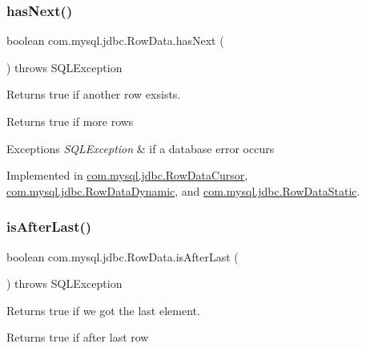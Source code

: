 \subsubsection{\texorpdfstring{has\+Next()}{hasNext()}}
{\footnotesize\ttfamily boolean com.\+mysql.\+jdbc.\+Row\+Data.\+has\+Next (\begin{DoxyParamCaption}{ }\end{DoxyParamCaption}) throws S\+Q\+L\+Exception}

Returns true if another row exsists.

\begin{DoxyReturn}{Returns}
true if more rows 
\end{DoxyReturn}

\begin{DoxyExceptions}{Exceptions}
{\em S\+Q\+L\+Exception} & if a database error occurs \\
\hline
\end{DoxyExceptions}


Implemented in \mbox{\hyperlink{classcom_1_1mysql_1_1jdbc_1_1_row_data_cursor_a1d8d73e103d1c80332773c360103314f}{com.\+mysql.\+jdbc.\+Row\+Data\+Cursor}}, \mbox{\hyperlink{classcom_1_1mysql_1_1jdbc_1_1_row_data_dynamic_a4a34ec97dbfebd279d8008c69316b5be}{com.\+mysql.\+jdbc.\+Row\+Data\+Dynamic}}, and \mbox{\hyperlink{classcom_1_1mysql_1_1jdbc_1_1_row_data_static_aaa4aefb2beeb7f12906587084204cee1}{com.\+mysql.\+jdbc.\+Row\+Data\+Static}}.

\mbox{\label{interfacecom_1_1mysql_1_1jdbc_1_1_row_data_ab19688b6d0fbdc4e9b7589e099f28ff7}} 
\subsubsection{\texorpdfstring{is\+After\+Last()}{isAfterLast()}}
{\footnotesize\ttfamily boolean com.\+mysql.\+jdbc.\+Row\+Data.\+is\+After\+Last (\begin{DoxyParamCaption}{ }\end{DoxyParamCaption}) throws S\+Q\+L\+Exception}

Returns true if we got the last element.

\begin{DoxyReturn}{Returns}
true if after last row 
\end{DoxyReturn}

